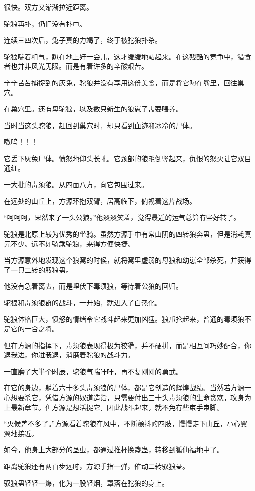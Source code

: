 \begin{this_body}
很快。双方又渐渐拉近距离。

驼狼再扑，仍旧没有扑中。

连续三四次后，兔子真的力竭了，终于被驼狼扑杀。

驼狼喘着粗气，趴在地上好一会儿，这才缓缓地站起来。在这残酷的竞争中，猎食者也并非风光无限。而是有着许多的辛酸艰苦。

辛辛苦苦捕捉到的灰兔，驼狼并没有享用这份美食，而是将它叼在嘴里，回往巢穴。

在巢穴里。还有母驼狼，以及数只新生的狼崽子需要喂养。

当时当这头驼狼，赶回到巢穴时，却只看到血迹和冰冷的尸体。

嗷呜！！！

它丢下灰兔尸体。愤怒地仰头长吼。它颈部的狼毛倒竖起来，仇恨的怒火让它双目通红。

一大批的毒须狼。从四面八方，向它包围过来。

在远处的山丘上，方源环抱双臂，居高临下，俯视着这片战场。

“呵呵呵，果然来了一头公狼。”他淡淡笑着，觉得最近的运气总算有些好转了。

驼狼是北原上较为优秀的坐骑。虽然方源手中有常山阴的四转狼奔蛊，但是消耗真元不少。远不如骑乘驼狼，来得方便快捷。

当方源意外地发现这个狼窝的时候，就将窝里虚弱的母狼和幼崽全部杀死，并获得了一只二转的驭狼蛊。

他没有急着离去，而是埋伏下毒须狼，等待着公狼的回归。

驼狼和毒须狼群的战斗，一开始，就进入了白热化。

驼狼体格巨大，愤怒的情绪令它战斗起来更加凶猛。狼爪抡起来，普通的毒须狼不是它的一合之将。

但在方源的指挥下，毒须狼表现得极为狡猾，并不硬拼，而是相互间巧妙配合，你退我进，你进我退，消磨着驼狼的战斗力。

一直磨了大半个时辰，驼狼气喘吁吁，再不复刚刚的勇武。

在它的身边，躺着六十多头毒须狼的尸体，都是它创造的辉煌战绩。当然若方源一心想要杀它，凭借方源的奴道造诣，只需要付出三十头毒须狼的生命贪欢，攻身为上最新章节。但方源是想活捉它，因此战斗起来，就不免有些束手束脚。

“火候差不多了。”方源看着驼狼在风中，不断颤抖的四肢，慢慢走下山丘，小心翼翼地接近。

如今，他身上大部分的蛊虫，都通过推杯换盏蛊，转移到狐仙福地中了。

距离驼狼还有两百步远时，方源手指一弹，催动二转驭狼蛊。

驭狼蛊轻轻一爆，化为一股轻烟，罩落在驼狼的身上。


\end{this_body}
